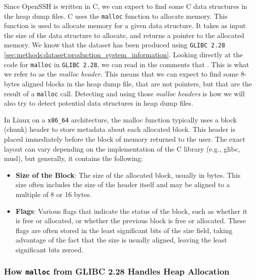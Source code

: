     Since OpenSSH is written in C, we can expect to find some C data structures in the heap dump files. C uses the \lstinline[language=c]|malloc| function to allocate memory. This function is used to allocate memory for a given data structure. It takes as input the size of the data structure to allocate, and returns a pointer to the allocated memory. We know that the dataset has been produced using \texttt{GLIBC 2.28} \ref{sec:methods:dataset:production_system_information}. Looking directly at the code for \lstinline[language=c]|malloc| in \texttt{GLIBC 2.28}, we can read in the comments that  \cite{MallocGLIBC2001}. This is what we refer to as the \textit{malloc header}. This means that we can expect to find some 8-bytes aligned blocks in the heap dump file, that are not pointers, but that are the result of a \lstinline[language=c]|malloc| call. Detecting and using those \textit{malloc headers} is how we will also try to detect potential data structures in heap dump files.

    In Linux on a \texttt{x86\_64} architecture, the malloc function typically uses a block (chunk) header to store metadata about each allocated block. This header is placed immediately before the block of memory returned to the user. The exact layout can vary depending on the implementation of the C library (e.g., glibc, musl), but generally, it contains the following:

    \begin{itemize}
        \item \textbf{Size of the Block}: The size of the allocated block, usually in bytes. This size often includes the size of the header itself and may be aligned to a multiple of 8 or 16 bytes.
        \item \textbf{Flags}: Various flags that indicate the status of the block, such as whether it is free or allocated, or whether the previous block is free or allocated. These flags are often stored in the least significant bits of the size field, taking advantage of the fact that the size is usually aligned, leaving the least significant bits zeroed.
    \end{itemize}

    \subsubsection{How \texttt{malloc} from GLIBC 2.28 Handles Heap Allocation}

